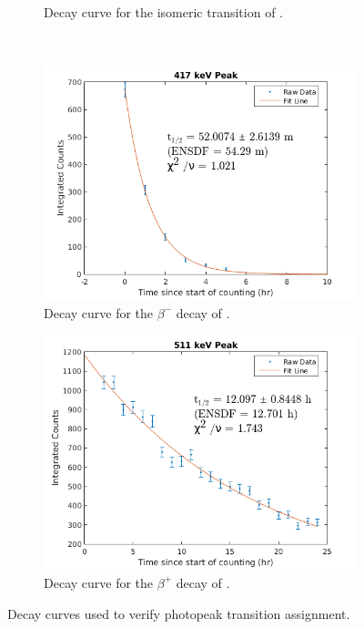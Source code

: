 \documentclass[5p]{elsarticle}
\begin{document}
\begin{figure}
\begin{subfigure}[t]{0.49\textwidth}
        \caption{ Decay curve for the isomeric transition of .}
        \label{fig:decay_curve_391}
    \end{subfigure}%
    \\
    \begin{subfigure}[t]{0.49\textwidth}
        \centering
        \includegraphics[scale=0.6]{./figures/417keV_curve2.png}
        \caption{Decay curve for the $\beta^-$ decay of .}
                \label{fig:decay_curve_417}
    \end{subfigure}
     \begin{subfigure}[t]{0.49\textwidth}
        \centering
        \includegraphics[scale=0.6]{./figures/511keV_curve2.png}
        \caption{ Decay curve for the $\beta^+$ decay of .}
        \label{fig:decay_curve_511}
    \end{subfigure}%
    \caption{Decay curves used to verify photopeak transition assignment.}
     \label{fig:decay_curves}
\end{figure}
\end{document}
